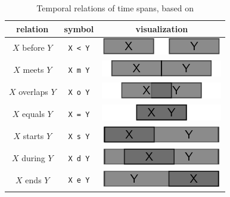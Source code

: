 \begin{table}[H]
\begin{center}
\begin{tabular}{c c c}
    relation & symbol & visualization \\
    \midrule
    $X$ before $Y$ &    \texttt{X < Y} & \raisebox{-0.25\height}
    {\includegraphics{graphics/basics/temporal_relations/before}} \\
    $X$ meets $Y$ &     \texttt{X m Y} & \raisebox{-0.25\height}
    {\includegraphics{graphics/basics/temporal_relations/meets}} \\
    $X$ overlaps $Y$ &  \texttt{X o Y} & \raisebox{-0.25\height}
    {\includegraphics{graphics/basics/temporal_relations/overlaps}} \\
    $X$ equals $Y$ &    \texttt{X = Y} & \raisebox{-0.25\height}
    {\includegraphics{graphics/basics/temporal_relations/equals}} \\
    $X$ starts $Y$ &    \texttt{X s Y} & \raisebox{-0.25\height}
    {\includegraphics{graphics/basics/temporal_relations/starts}} \\
    $X$ during $Y$ &    \texttt{X d Y} & \raisebox{-0.25\height}
    {\includegraphics{graphics/basics/temporal_relations/during}} \\
    $X$ ends $Y$ &      \texttt{X e Y} & \raisebox{-0.25\height}
    {\includegraphics{graphics/basics/temporal_relations/ends}} \\
\end{tabular}
\caption{Temporal relations of time spans, based on \cite{allen84}}
\label{tab:temporal_relations}
\end{center}
\end{table}

